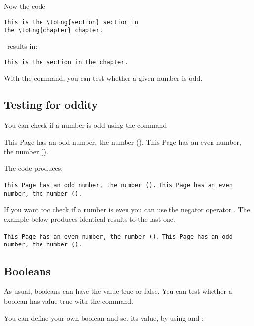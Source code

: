 Now the code 

\begin{verbatim}
This is the \toEng{section} section in
the \toEng{chapter} chapter.
\end{verbatim}

\noindent\ results in:

\texttt{This is the  section in
the  chapter.}


With the  command, you can test whether a given number
is odd.

\subsection{Testing for oddity}

You can check if a number is odd using the command 

\begin{teX}
\ifthenelse{\isodd{\thepage}}
   {This Page has an odd number, the number (\thepage).}
   {This Page has an even number, the number (\thepage).}
\end{teX}  

The code produces:
\medskip

\ifthenelse{\isodd{\thepage}}
   {\texttt{This Page has an odd number, the number (\thepage).}}
   {\texttt{This Page has an even number, the number (\thepage).}}

If you want toc check if a number is even you can use the negator
operator . The example below produces identical results to the last one.

\begin{teX}
\ifthenelse{\NOT\isodd{\thepage}}
{\tt This Page has an even number, the number (\thepage).}
{\tt This Page has an odd number, the number (\thepage).}
\end{teX}

\subsection{Booleans}

As usual, booleans can have the value true or false. You can
test whether a boolean has value true with the  command.

\begin{teX}
\end{teX}

You can define your own boolean and set its value, by using
 and :

